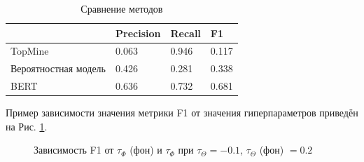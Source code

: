 \documentclass[a4paper, 12pt]{article}
\begin{document}
    \begin{table}[!ht]
    \caption{Сравнение методов}
    \label{table:TopMine}
    \centering\medskip
    \begin{tabular}{|l|l|l|l|}
    \hline
        & Precision & Recall & F1 \\ \hline
        TopMine & 0.063 & 0.946 & 0.117 \\ \hline
        Вероятностная модель & 0.426 & 0.281 & 0.338 \\ \hline
        BERT & 0.636 & 0.732 & 0.681 \\
        \hline
    \end{tabular}
\end{table}

    Пример зависимости значения метрики F1 от значения гиперпараметров приведён на Рис. \ref{fg:Res}.
    
    \begin{figure}[!ht]
    \caption{Зависимость F1 от $\tau_{\Phi}$ (фон) и $\tau_{\Phi}$ при $\tau_{\Theta} = -0.1$, $\tau_{\Theta}$ (фон) $=0.2$}
    \label{fg:Res}
    \end{figure}
\end{document}
